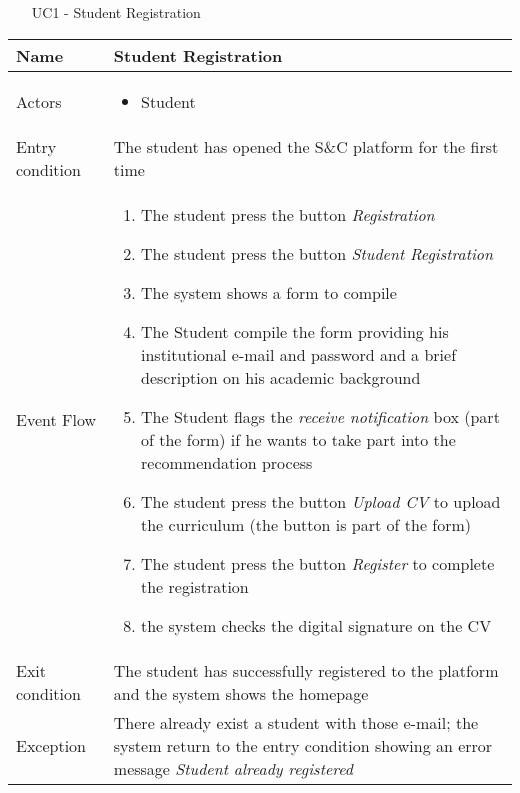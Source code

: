 			\begin{table} [H]
				\centering
				\begin{itemize}
					\item [UC1] - Student Registration
				\end{itemize}
				\begin{tabular}{|| P{7.5cm} | P{7.5cm} ||}
					\hline
					Name & Student Registration \\
					\hline
					Actors & \parbox{5cm}{\begin{itemize}
							\item Student
							\end{itemize}
						} \\
					\hline
					Entry condition & The student has opened the S\&C platform for the first time \\
					\hline
					Event Flow & \parbox{5cm}{\begin{enumerate}
						\item The student press the button \textit{Registration}
						\item The student press the button \textit{Student Registration}
						\item The system shows a form to compile
						\item The Student compile the form providing his institutional e-mail and password and a brief description on his academic 
						background
						\item The Student flags the \textit{receive 
						notification} box (part of the form) 
						if he wants to take part into the recommendation process 
						\item The student press the button 
						\textit{Upload CV} to upload the 
						curriculum (the button is part of 
						the form)
						\item The student press the button 
						\textit{Register} to complete the 
						registration
						\item the system checks the digital signature on the CV
						\end{enumerate}} \\
					\hline 
					Exit condition & The student has successfully registered 
					to the platform and the system shows the 
					homepage \\
					\hline
					Exception & There already exist a student with those e-mail; the system return to the entry condition showing an error message \textit{Student already registered} \\
					\hline
				\end{tabular}
			\end{table}
			
